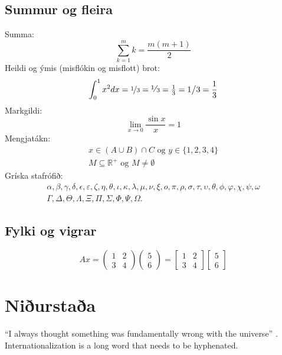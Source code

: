\documentclass[12pt]{article}    %
\begin{document}
\subsection{Summur og fleira}
Summa:
$$
\sum_{k=1}^m k=\frac{m(m+1)}{2}
$$
Heildi og ýmis (misflókin og misflott) brot:
$$
\int_0^1 x^2 dx = \nicefrac{1}{3} = \text{\large{\sfrac{1}{3}}} 
= \tfrac{1}{3} = 1\big/3 = \frac{1}{3}
$$
Markgildi:
$$
\lim_{x \to 0}\frac{\sin x}{x} = 1  %
$$
Mengjatákn:
\begin{gather*}
x \in (A \cup B) \cap C 
\text{ og } y \in \big\{1,2,3,4\big\} \\
M \subseteq\mathbb{R}^+ \text{ og } M \neq \emptyset
\end{gather*}
Gríska stafrófið:
\begin{gather*}
\alpha, \beta, \gamma, \delta, \epsilon, \varepsilon, \zeta, \eta, \theta, \iota, \kappa, \lambda, \mu, \nu, \xi, o, \pi, \rho, \sigma, \tau, \upsilon, \theta, \phi, \varphi, \chi, \psi, \omega \\
\Gamma, \Delta, \Theta, \Lambda, \Xi, \Pi, \Sigma, \Phi, \Psi, \Omega.
\end{gather*}

\subsection{Fylki og vigrar}
$$
Ax = \begin{pmatrix}  %
1 & 2\\
3 & 4
\end{pmatrix}
\begin{pmatrix} 5\\6 \end{pmatrix}
= \begin{bmatrix}  %
1 & 2\\
3 & 4
\end{bmatrix}
\begin{bmatrix} 5\\6 \end{bmatrix}
$$

\section{Niðurstaða} %
\label{kafli:nidurstada}
\begin{otherlanguage}{english}
``I always thought something was fundamentally wrong with the universe'' \cite{adams1995hitchhiker}. Internationalization is a long word that needs to be hyphenated.
\end{otherlanguage}



\end{document}
